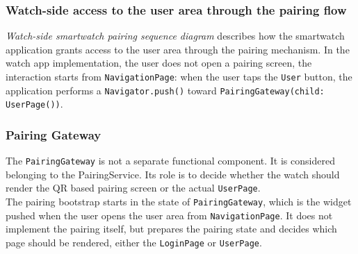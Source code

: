 \newpage
\subsubsection{Watch-side access to the user area through the pairing flow}
\textit{Watch-side smartwatch pairing sequence diagram} describes how the smartwatch application grants access to the user area through the pairing mechanism. In the watch app implementation, the user does not open a pairing screen, the interaction starts from \texttt{NavigationPage}: when the user taps the \texttt{User} button, the application performs a \texttt{Navigator.push()} toward \texttt{PairingGateway(child: UserPage())}. \\


\subsubsection{Pairing Gateway}
The  \texttt{PairingGateway}  is not a separate functional component. It is considered belonging to the PairingService. 
Its role is to decide whether the watch should render the QR based pairing screen or the actual \texttt{UserPage}. \\
The pairing bootstrap starts in the state of \texttt{PairingGateway}, which is the widget pushed when the user opens the user area from \texttt{NavigationPage}. It does not implement the pairing itself, but prepares the pairing state and decides which page should be rendered, either the \texttt{LoginPage} or \texttt{UserPage}. \\

